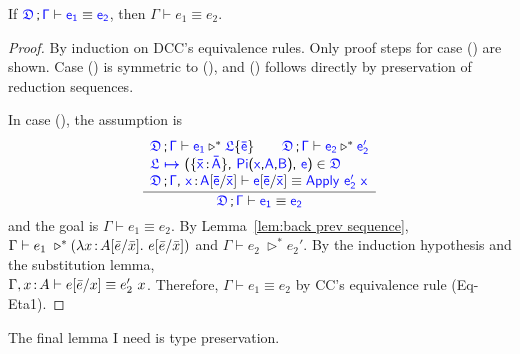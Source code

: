 \begin{lemma}If $\targetcon \vdash \target{e_1} \equiv \target{e_2}$, then $\Gamma \vdash e_1 \equiv e_2$.
\begin{proof}
By induction on DCC's equivalence rules. Only proof steps for case () are shown. Case () is symmetric to (), and () follows directly by preservation of reduction sequences.

In case (), the assumption is 
\begin{equation*}
	\frac
	{\begin{array}{l}
	  \target{\fdef}\semicolon \target{\Gamma} \vdash \target{e_1} \triangleright^* \targetlab{\flabel}{\bar{e}} \qquad
      \target{\fdef}\semicolon \target{\Gamma} \vdash \target{e_2} \triangleright^* \target{e_2'} \\
      \itemdef{\target{\flabel}}{\itemtype{\bar{x}}{\bar{A}}}{\targetpi{x}{A}{B}}{\target{e}} \in \target{\fdef} \\
      \target{\fdef}\semicolon \target{\Gamma}\sfcomma \itemtype{x}{A} \targetsub{\bar{e}}{\bar{x}} \vdash 
      \target{e}\targetsub{\bar{e}}{\bar{x}} \equiv \targetapp{e_2'}{x}
	\end{array}}
	{\target{\fdef}\semicolon \target{\Gamma} \vdash \target{e_1} \equiv \target{e_2}}
\end{equation*}
and the goal is $\Gamma \vdash e_1 \equiv e_2$. By Lemma~\ref{lem:back prev sequence}, 
$\Gamma \vdash e_1\ \triangleright^* (\lambda x\hspace{0.5mm}{:}\hspace{0.5mm} A[\bar{e}\slash\bar{x}].\ e[\bar{e}\slash\bar{x}])$ and 
$\Gamma \vdash e_2\ \triangleright^* e_2'$.
By the induction hypothesis and the substitution lemma, \\
$\Gamma, x \hspace{0.5mm}{:}\hspace{0.5mm} A \vdash e[\bar{e}\slash x] \equiv e_2'\ x$.
Therefore, $\Gamma \vdash e_1 \equiv e_2$ by CC's equivalence rule (Eq-Eta1).
\end{proof}
\end{lemma}

The final lemma I need is type preservation.

